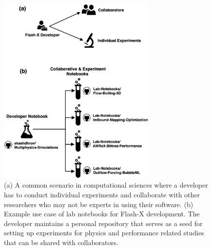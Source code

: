 \documentclass{IEEEcsmag}
\begin{document}
\begin{figure}[h]
\centerline{\includegraphics[width=18.5pc]{case-study.png}}
\caption{(a) A common scenario in computational sciences where a developer has to conduct individual experiments and collaborate with other researchers who may not be experts in using their software. (b) Example use case of lab notebooks for Flash-X development. The developer maintains a personal repository that serves as a seed for setting up experiments for physics and performance related studies that can be shared with collaborators.}
\label{fig:case-study-example}
\end{figure}
\end{document}
